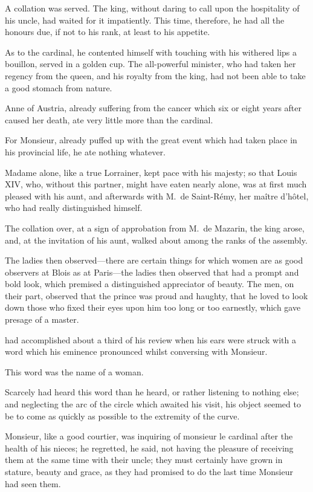 A collation was served. The king, without daring to call upon the hospitality of his uncle, had waited for it impatiently. This time, therefore, he had all the honours due, if not to his rank, at least to his appetite.

As to the cardinal, he contented himself with touching with his withered lips a bouillon, served in a golden cup. The all-powerful minister, who had taken her regency from the queen, and his royalty from the king, had not been able to take a good stomach from nature.

Anne of Austria, already suffering from the cancer which six or eight years after caused her death, ate very little more than the cardinal.

For Monsieur, already puffed up with the great event which had taken place in his provincial life, he ate nothing whatever.

Madame alone, like a true Lorrainer, kept pace with his majesty; so that Louis XIV, who, without this partner, might have eaten nearly alone, was at first much pleased with his aunt, and afterwards with M.~de Saint-Rémy, her maître d'hôtel, who had really distinguished himself.

The collation over, at a sign of approbation from M.~de Mazarin, the king arose, and, at the invitation of his aunt, walked about among the ranks of the assembly.

The ladies then observed—there are certain things for which women are as good observers at Blois as at Paris—the ladies then observed that  had a prompt and bold look, which premised a distinguished appreciator of beauty. The men, on their part, observed that the prince was proud and haughty, that he loved to look down those who fixed their eyes upon him too long or too earnestly, which gave presage of a master.

 had accomplished about a third of his review when his ears were struck with a word which his eminence pronounced whilst conversing with Monsieur.

This word was the name of a woman.

Scarcely had  heard this word than he heard, or rather listening to nothing else; and neglecting the arc of the circle which awaited his visit, his object seemed to be to come as quickly as possible to the extremity of the curve.

Monsieur, like a good courtier, was inquiring of monsieur le cardinal after the health of his nieces; he regretted, he said, not having the pleasure of receiving them at the same time with their uncle; they must certainly have grown in stature, beauty and grace, as they had promised to do the last time Monsieur had seen them.

